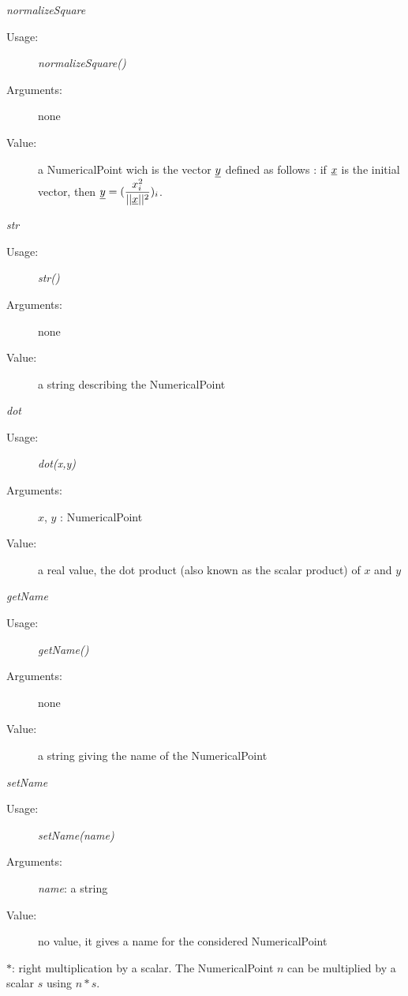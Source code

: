 \begin{description}
\begin{description}
\item \textit{normalizeSquare}
\begin{description}
\item[Usage:] \textit{normalizeSquare()}
\item[Arguments:] none
\item[Value:] a NumericalPoint wich is the vector ${\underline{y}}$ defined as follows : if ${\underline{x}}$ is the initial vector, then  ${\underline{y}} = (\displaystyle \frac{x_i^2}{||{\underline{x}}||^2})_i$.
\end{description}
\bigskip

\item \textit{str}
\begin{description}
\item[Usage:] \textit{str()}
\item[Arguments:] none
\item[Value:] a string describing the NumericalPoint
\end{description}
\bigskip

\item \textit{dot}
\begin{description}
\item[Usage:] \textit{dot(x,y)}
\item[Arguments:] $x$, $y$ : NumericalPoint
\item[Value:] a real value, the dot product (also known as the scalar product) of $x$ and $y$
\end{description}
\bigskip

\item \textit{getName}
\begin{description}
\item[Usage:] \textit{getName()}
\item[Arguments:] none
\item[Value:] a string giving the name of the NumericalPoint
\end{description}
\bigskip

\item \textit{setName}
\begin{description}
\item[Usage:] \textit{setName(name)}
\item[Arguments:] \textit{name}: a string
\item[Value:] no value, it gives a name for the considered NumericalPoint
\end{description}

\item $*$: right multiplication by a scalar. The NumericalPoint $n$ can be multiplied by a scalar $s$ using $n * s$.
\end{description}

\end{description}




